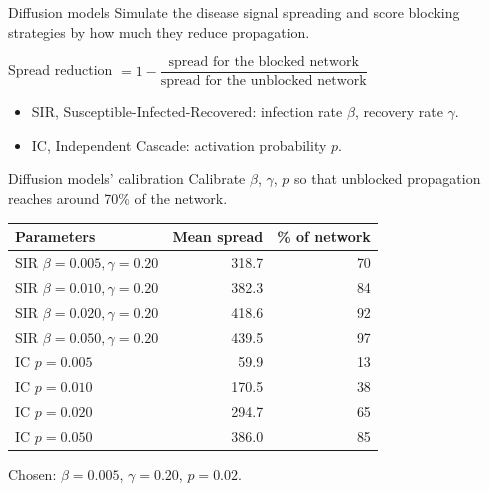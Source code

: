 \documentclass[aspectratio=169]{beamer}
\begin{document}
\begin{frame}{Diffusion models}
  Simulate the disease signal spreading and score blocking strategies by how much they reduce propagation.

  \vspace{0.5em}

  Spread reduction $= 1 - \dfrac{\text{spread for the blocked network}}{\text{spread for the unblocked network}}$

  \vspace{0.5em}

  \begin{itemize}
    \item SIR, Susceptible-Infected-Recovered: infection rate $\beta$, recovery rate $\gamma$.
    \item IC, Independent Cascade: activation probability $p$.
  \end{itemize}
\end{frame}



\begin{frame}{Diffusion models' calibration}
  Calibrate $\beta$, $\gamma$, $p$ so that unblocked propagation reaches around 70\% of the network.

  \vspace{0.5em}

  \centering
  \begin{tabular}{lrr}
    \toprule
    Parameters & Mean spread & \% of network \\
    \midrule
    SIR $\beta=0.005, \gamma=0.20$ & 318.7 & 70 \\
    SIR $\beta=0.010, \gamma=0.20$ & 382.3 & 84 \\
    SIR $\beta=0.020, \gamma=0.20$ & 418.6 & 92 \\
    SIR $\beta=0.050, \gamma=0.20$ & 439.5 & 97 \\
    IC $p=0.005$  &  59.9 & 13 \\
    IC $p=0.010$  & 170.5 & 38 \\
    IC $p=0.020$  & 294.7 & 65 \\
    IC $p=0.050$  & 386.0 & 85 \\
    \bottomrule
  \end{tabular}

  \vspace{0.5em}

  Chosen: $\beta = 0.005$, $\gamma = 0.20$, $p = 0.02$.
\end{frame}
\end{document}
